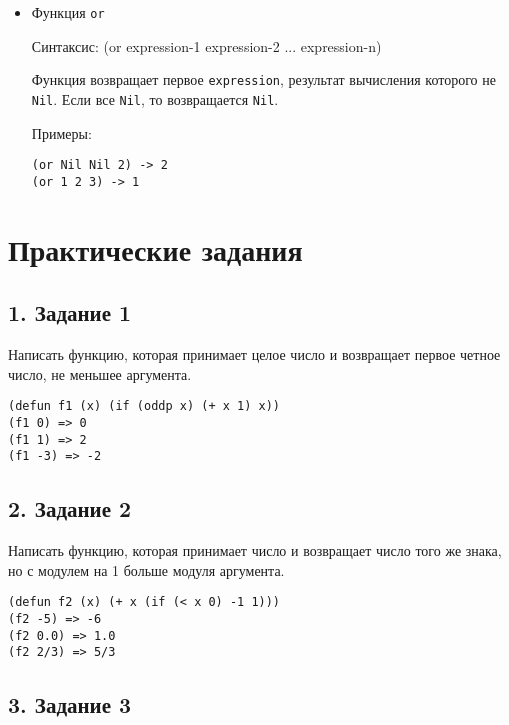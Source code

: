 \begin {itemize}
\hspace{1cm}Примеры:
\begin{lstlisting}
(and 1 Nil 2) -> %\texttt{Nil}%
(and 1 2 3) -> 3
\end{lstlisting}

\item Функция \texttt{or}

\hspace{1cm}Синтаксис: (or expression-1 expression-2 ... expression-n)

\hspace{1cm}Функция возвращает первое \texttt{expression}, результат вычисления которого не \texttt{Nil}. Если все \texttt{Nil}, то возвращается \texttt{Nil}.

\hspace{1cm}Примеры:
\begin{lstlisting}
(or Nil Nil 2) -> 2
(or 1 2 3) -> 1
\end{lstlisting}
\end{itemize}
\newpage
\section*{Практические задания}

\subsection*{1. Задание 1}

Написать функцию, которая принимает целое число и возвращает первое четное число, не меньшее аргумента.
\begin{lstlisting}
(defun f1 (x) (if (oddp x) (+ x 1) x))
(f1 0) => 0
(f1 1) => 2
(f1 -3) => -2
\end{lstlisting}

\subsection*{2. Задание 2}

Написать функцию, которая принимает число и возвращает число того же знака, но с модулем на 1 больше модуля аргумента.

\begin{lstlisting}
(defun f2 (x) (+ x (if (< x 0) -1 1)))
(f2 -5) => -6
(f2 0.0) => 1.0
(f2 2/3) => 5/3
\end{lstlisting}

\subsection*{3. Задание 3}

